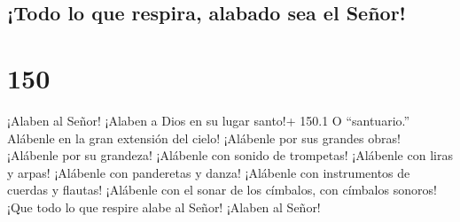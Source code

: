 \hypertarget{todo-lo-que-respira-alabado-sea-el-seuxf1or}{%
\subsection{¡Todo lo que respira, alabado sea el
Señor!}\label{todo-lo-que-respira-alabado-sea-el-seuxf1or}}

\hypertarget{section-149}{%
\section{150}\label{section-149}}

 ¡Alaben al Señor! ¡Alaben a Dios en su lugar santo!+ 150.1
O ``santuario.'' Alábenle en la gran extensión del cielo! 
¡Alábenle por sus grandes obras! ¡Alábenle por su grandeza! 
¡Alábenle con sonido de trompetas! ¡Alábenle con liras y arpas!
 ¡Alábenle con panderetas y danza! ¡Alábenle con
instrumentos de cuerdas y flautas!  ¡Alábenle con el sonar
de los címbalos, con címbalos sonoros!  ¡Que todo lo que
respire alabe al Señor! ¡Alaben al Señor!
